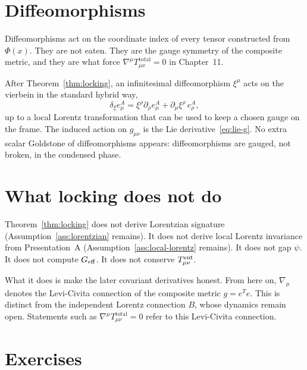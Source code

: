 \section{Diffeomorphisms}
\label{sec:ch10-diffs}

Diffeomorphisms act on the coordinate index of every tensor
constructed from \(\Phi(x)\). They are not eaten. They are the
gauge symmetry of the composite metric, and they are what force
\(\nabla^\mu T_{\mu\nu}^{\mathrm{total}}=0\) in Chapter~11.

After Theorem~\ref{thm:locking}, an infinitesimal diffeomorphism
\(\xi^\mu\) acts on the vierbein in the standard hybrid way,
\begin{equation}
  \label{eq:lie-vierbein}
  \delta_\xi e^A_\mu
  =\xi^\rho\partial_\rho e^A_\mu
   +\partial_\mu\xi^\rho\,e^A_\rho,
\end{equation}
up to a local Lorentz transformation that can be used to keep a
chosen gauge on the frame. The induced action on \(g_{\mu\nu}\) is
the Lie derivative~\eqref{eq:lie-g}. No extra scalar Goldstone of
diffeomorphisms appears: diffeomorphisms are gauged, not broken, in
the condensed phase.

\section{What locking does not do}
\label{sec:ch10-not}

Theorem~\ref{thm:locking} does not derive Lorentzian signature
(Assumption~\ref{ass:lorentzian} remains). It does not derive local
Lorentz invariance from Presentation~A
(Assumption~\ref{ass:local-lorentz} remains). It does not gap
\(\psi\). It does not compute \(G_{\mathrm{eff}}\). It does not conserve
\(T^{\mathrm{ent}}_{\mu\nu}\).

What it does is make the later covariant derivatives honest. From
here on, \(\nabla_\mu\) denotes the Levi-Civita connection of the
composite metric \(g=e^T e\). This is distinct from the independent
Lorentz connection \(B\), whose dynamics remain open. Statements
such as \(\nabla^\mu T_{\mu\nu}^{\mathrm{total}}=0\) refer to this
Levi-Civita connection.

\section{Exercises}
\label{sec:ch10-exercises}

